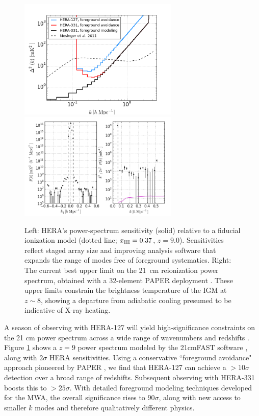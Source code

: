 \documentclass[preprint]{aastex}
\def\HI{{H{\small I }}}
\def\xHI{{x_{\rm\HI}}}
\begin{document}
\begin{figure}[t]\centering
\includegraphics[width=3in]{plots/Pspec/eor_pspec_2014.png}
\includegraphics[width=3in]{plots/Pspec/pk_k3pk.png} %
\caption{\small Left: HERA's power-spectrum sensitivity (solid)
relative to a fiducial ionization model (dotted line; $\xHI=0.37$, $z=9.0$).
Sensitivities reflect staged array size and
improving analysis software that expands the range
of modes free of foreground systematics.
Right: The current best upper limit on the 21~cm reionization power spectrum,
obtained with a 32-element PAPER deployment \citep{parsons_et_al2013}.  These upper limits
constrain the brightness temperature of the IGM at $z\sim8$, showing
a departure from adiabatic cooling presumed to be indicative of X-ray heating.
}\label{fig:eor_pspec}
\end{figure}

A season of observing with HERA-127 will yield high-significance constraints on the 21 cm power
spectrum across a wide range of wavenumbers and redshifts \citep{pober_et_al2014}.  
Figure \ref{fig:eor_pspec} shows a $z=9$ power spectrum modeled by the 21cmFAST software \citep{mesinger_et_al2011},
along with $2\sigma$ HERA sensitivities.  Using a conservative ``foreground avoidance"
approach pioneered by PAPER \citep{parsons_et_al2013}, we find that
HERA-127 can achieve a $> 10\sigma$ detection over a broad range of redshifts.
Subsequent observing with HERA-331 boosts this to $>25\sigma$.  With detailed foreground modeling techniques
developed for the MWA, the overall significance rises to $90\sigma$,
along with new access to smaller $k$ modes and therefore qualitatively different physics.
\end{document}
